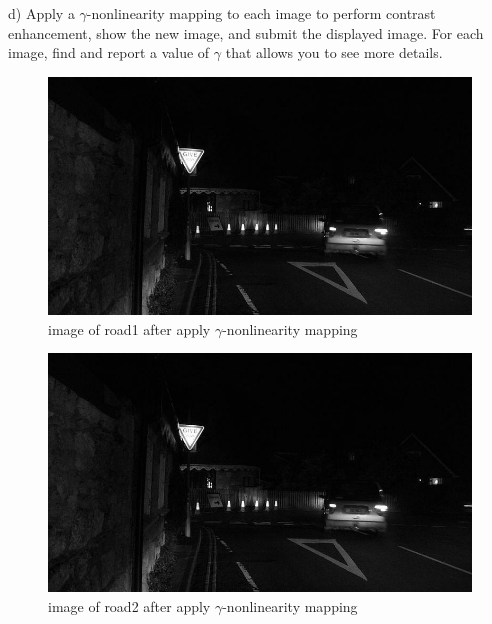 \documentclass[
	12pt, %
]{fphw}
\begin{document}
\begin{problem}
	d)  Apply a $\gamma$-nonlinearity mapping to each image to perform contrast enhancement, show the new image, and
	submit the displayed image. For each image, find and report a value of $\gamma$ that allows you to see more details.
	
\end{problem}
\begin{figure}[H]
 
	\centering
	\includegraphics[width=1\columnwidth]{T2/result/I1_gama.jpg} 
	\caption{image of road1 after apply $\gamma$-nonlinearity mapping}
	\label{fig22}
\end{figure}
\begin{figure}[H]
 
	\centering
	\includegraphics[width=1\columnwidth]{T2/result/I2_gama.jpg} 
	\caption{image of road2 after apply $\gamma$-nonlinearity mapping}
	\label{fig23}
\end{figure}
\end{document}
